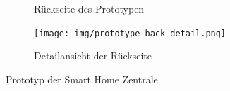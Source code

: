 \begin{figure}[H]
\begin{subfigure}[b]{0.5\linewidth}
		\caption[Rückseiteseite des Prototypen]{Rückseite des Prototypen}
	\end{subfigure}
	\begin{subfigure}[b]{1\linewidth}
		\texttt{[image: img/prototype\_back\_detail.png]}
		\caption[Detailansicht der Rückseite]{Detailansicht der Rückseite}
		\label{fig:prototype_back}
	\end{subfigure}
	\caption[Prototyp der Smart Home Zentrale]{Prototyp der Smart Home Zentrale}
	\label{prototype}
\end{figure}
\newpage